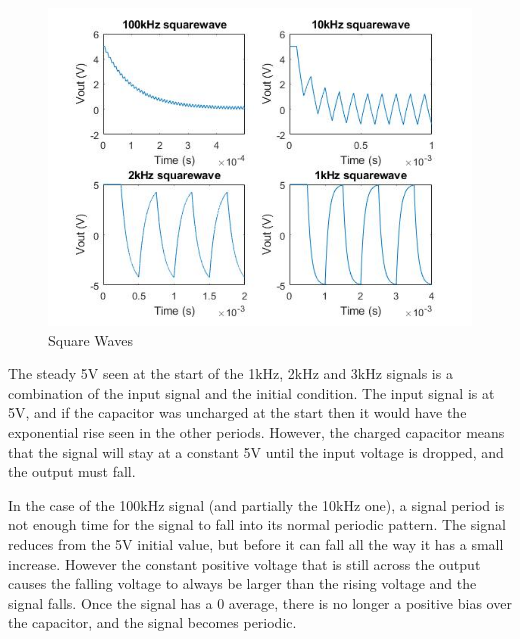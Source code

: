 \documentclass[11pt, oneside, titlepage]{article}   	%
\begin{document}
\begin{figure}[H]
\center
\includegraphics[scale = 0.5]{exercise1_13}
\caption{Square Waves} \label{fig:ex1_13}
\end{figure}

The steady 5V seen at the start of the 1kHz, 2kHz and 3kHz signals is a combination of the input signal and the initial condition. The input signal is at 5V, and if the capacitor was uncharged at the start then it would have the exponential rise seen in the other periods. However, the charged capacitor means that the signal will stay at a constant 5V until the input voltage is dropped, and the output must fall. 

In the case of the 100kHz signal (and partially the 10kHz one), a signal period is not enough time for the signal to fall into its normal periodic pattern. The signal reduces from the 5V initial value, but before it can fall all the way it has a small increase. However the constant positive voltage that is still across the output causes the falling voltage to always be larger than the rising voltage and the signal falls. Once the signal has a 0 average, there is no longer a positive bias over the capacitor, and the signal becomes periodic. 
\end{document}

